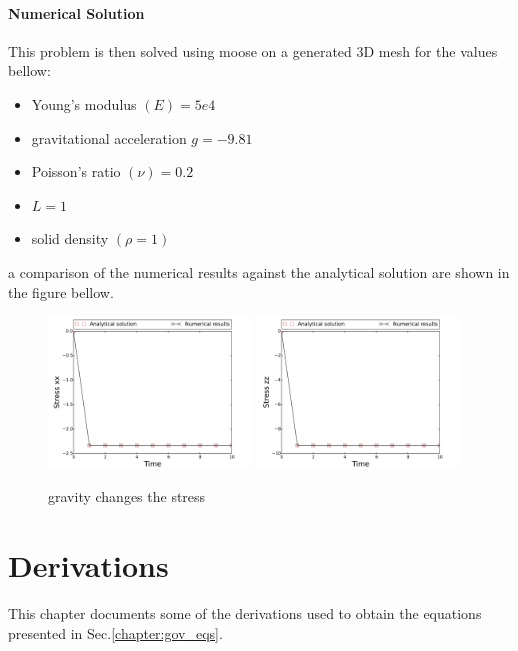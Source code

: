 \documentclass[]{scrreprt}
\begin{document}
\subsubsection{Numerical Solution}
This problem is then solved using moose on a generated 3D mesh for the values bellow:
\begin{itemize}
\item Young's modulus $(E)=5e4$\
\item gravitational acceleration $g =-9.81$\
\item Poisson's ratio $(\nu) =0.2$\
\item $L=1$\
\item  solid density $(\rho=1)$\
\end{itemize}
 a comparison of the numerical results against the analytical solution are shown in the figure bellow.
 \begin{figure}
\label{fig:gravity_rho_g_h}
  \centering
  \includegraphics[width=0.48\textwidth]{gravity/gravity_gravity_rho_g_h_stress_xx}
  \includegraphics[width=0.48\textwidth]{gravity/gravity_gravity_rho_g_h_stress_zz}\\
 
  \caption{gravity changes the stress  }
 \end{figure}

\appendix

\chapter{Derivations}
\label{chapter:derivations}
This chapter documents some of the derivations used to obtain the equations presented in Sec.\ref{chapter:gov_eqs}.
\end{document}
